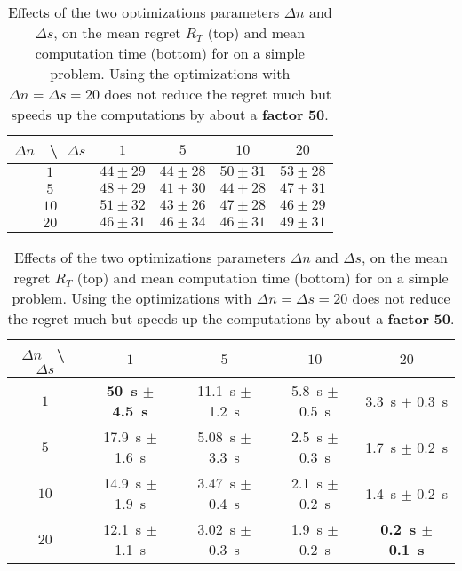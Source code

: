 \begin{table}[ht]
    \centering
        \begin{tabular}{c|cccc}
            $\Delta n$ $\;$ \textbackslash $\;$ $\Delta s$ & $1$ & $5$ & $10$ & $20$ \\
            \hline
            $1$ & $44 \pm 29$ & $44 \pm 28$ & $50 \pm 31$ & $53 \pm 28$ \\
            $5$ & $48 \pm 29$ & $41 \pm 30$ & $44 \pm 28$ & $47 \pm 31$ \\
            $10$ & $51 \pm 32$ & $43 \pm 26$ & $47 \pm 28$ & $46 \pm 29$ \\
            $20$ & $46 \pm 31$ & $46 \pm 34$ & $46 \pm 31$ & $49 \pm 31$
        \end{tabular}
    \hspace{0.5cm}

        \begin{tabular}{c|cccc}
            $\Delta n$ $\;$ \textbackslash $\;$ $\Delta s$
            & $1$ & $5$ & $10$ & $20$ \\
            \hline
            $1$ & \textbf{\SI{50}{\second} $\pm$ \SI{4.5}{\second}} & \SI{11.1}{\second} $\pm$ \SI{1.2}{\second} & \SI{5.8}{\second} $\pm$ \SI{0.5}{\second} & \SI{3.3}{\second} $\pm$ \SI{0.3}{\second} \\
            $5$ & \SI{17.9}{\second} $\pm$ \SI{1.6}{\second} & \SI{5.08}{\second} $\pm$ \SI{3.3}{\second} & \SI{2.5}{\second} $\pm$ \SI{0.3}{\second} & \SI{1.7}{\second} $\pm$ \SI{0.2}{\second}  \\
            $10$ & \SI{14.9}{\second} $\pm$ \SI{1.9}{\second} & \SI{3.47}{\second} $\pm$ \SI{0.4}{\second} & \SI{2.1}{\second} $\pm$ \SI{0.2}{\second} & \SI{1.4}{\second} $\pm$ \SI{0.2}{\second} \\
            $20$ & \SI{12.1}{\second} $\pm$ \SI{1.1}{\second} & \SI{3.02}{\second} $\pm$ \SI{0.3}{\second} & \SI{1.9}{\second} $\pm$ \SI{0.2}{\second} & \textbf{\SI{0.2}{\second} $\pm$ \SI{0.1}{\second}}
        \end{tabular}
    \caption{Effects of the two optimizations parameters $\Delta n$ and $\Delta s$, on the mean regret $R_T$ (top) and mean computation time (bottom) for \GLRklUCB{} on a simple problem. Using the optimizations with $\Delta n = \Delta s = 20$ does not reduce the regret much but speeds up the computations by about a \textbf{factor} $\mathbf{50}$.}
    \label{table:6:effectOptimizations}
\end{table}



